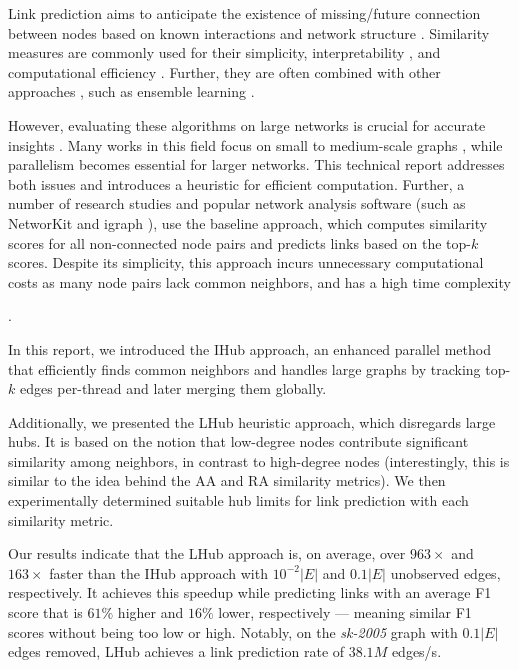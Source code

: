Link prediction aims to anticipate the existence of missing/future connection between nodes based on known interactions and network structure \cite{arrar2023comprehensive}. Similarity measures are commonly used for their simplicity, interpretability \cite{pai2019netdx, barbieri2014follow}, and computational efficiency \cite{garcia2014link}. Further, they are often combined with other approaches \cite{kumari2022supervised, abuoda2020link, pai2019netdx}, such as ensemble learning \cite{zhou2012ensemble}.

However, evaluating these algorithms on large networks is crucial for accurate insights \cite{zhou2021progresses, zhou2021experimental}. Many works in this field focus on small \cite{guo2019node, rafiee2020cndp, mumin2022efficient, papadimitriou2012fast, vega2021link, saifi2023fast, ferreira2019scalability, benhidour2022approach} to medium-scale graphs \cite{yang2015new, cui2016bounded, kalkanfinding, mohan2017scalable, wang2019link, bastami2019gravitation, shin2012multi, garcia2014link}, while parallelism becomes essential for larger networks. This technical report addresses both issues and introduces a heuristic for efficient computation. Further, a number of research studies \cite{gatadi2023lpcd, saifi2023fast, benhidour2022approach, mumin2022efficient, rafiee2020cndp, guo2019node, yang2015new, papadimitriou2012fast, wang2019link} and popular network analysis software (such as NetworKit \cite{staudt2016networkit} and igraph \cite{csardi2006igraph}), use the baseline approach, which computes similarity scores for all non-connected node pairs and predicts links based on the top-$k$ scores. Despite its simplicity, this approach incurs unnecessary computational costs as many node pairs lack common neighbors, and has a high time complexity.

In this report, we introduced the IHub approach, an enhanced parallel method that efficiently finds common neighbors and handles large graphs by tracking top-$k$ edges per-thread and later merging them globally. Additionally, we presented the LHub heuristic approach, which disregards large hubs. It is based on the notion that low-degree nodes contribute significant similarity among neighbors, in contrast to high-degree nodes (interestingly, this is similar to the idea behind the AA and RA similarity metrics). We then experimentally determined suitable hub limits for link prediction with each similarity metric.

Our results indicate that the LHub approach is, on average, over $963\times$ and $163\times$ faster than the IHub approach with $10^{-2}|E|$ and $0.1|E|$ unobserved edges, respectively. It achieves this speedup while predicting links with an average F1 score that is $61\%$ higher and $16\%$ lower, respectively --- meaning similar F1 scores without being too low or high. Notably, on the \textit{sk-2005} graph with $0.1|E|$ edges removed, LHub achieves a link prediction rate of $38.1M$ edges/s.

